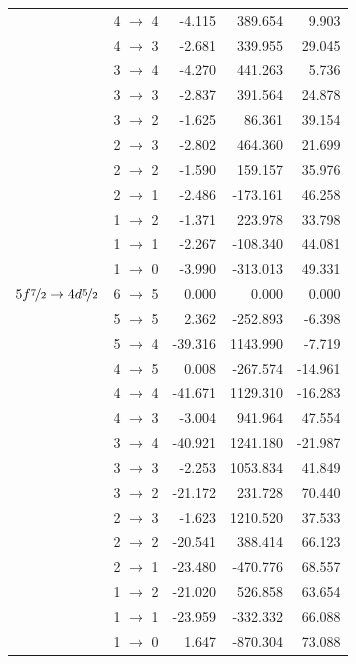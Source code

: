 \begin{table}[b]
\begin{small}
\begin{tabular}{cc|rrr}
&4 $\rightarrow$ 4&-4.115&389.654&9.903\\
&4 $\rightarrow$ 3&-2.681&339.955&29.045\\
&3 $\rightarrow$ 4&-4.270&441.263&5.736\\
&3 $\rightarrow$ 3&-2.837&391.564&24.878\\
&3 $\rightarrow$ 2&-1.625&86.361&39.154\\
&2 $\rightarrow$ 3&-2.802&464.360&21.699\\
&2 $\rightarrow$ 2&-1.590&159.157&35.976\\
&2 $\rightarrow$ 1&-2.486&-173.161&46.258\\
&1 $\rightarrow$ 2&-1.371&223.978&33.798\\
&1 $\rightarrow$ 1&-2.267&-108.340&44.081\\
&1 $\rightarrow$ 0&-3.990&-313.013&49.331\\[10pt]
$5f\nicefrac{7}{2} \rightarrow 4d\nicefrac{5}{2}$ &6 $\rightarrow$ 5&0.000&0.000&0.000\\
&5 $\rightarrow$ 5&2.362&-252.893&-6.398\\
&5 $\rightarrow$ 4&-39.316&1143.990&-7.719\\
&4 $\rightarrow$ 5&0.008&-267.574&-14.961\\
&4 $\rightarrow$ 4&-41.671&1129.310&-16.283\\
&4 $\rightarrow$ 3&-3.004&941.964&47.554\\
&3 $\rightarrow$ 4&-40.921&1241.180&-21.987\\
&3 $\rightarrow$ 3&-2.253&1053.834&41.849\\
&3 $\rightarrow$ 2&-21.172&231.728&70.440\\
&2 $\rightarrow$ 3&-1.623&1210.520&37.533\\
&2 $\rightarrow$ 2&-20.541&388.414&66.123\\
&2 $\rightarrow$ 1&-23.480&-470.776&68.557\\
&1 $\rightarrow$ 2&-21.020&526.858&63.654\\
&1 $\rightarrow$ 1&-23.959&-332.332&66.088\\
&1 $\rightarrow$ 0&1.647&-870.304&73.088
\end{tabular}
\end{small}
\end{table}%
%
%
%
